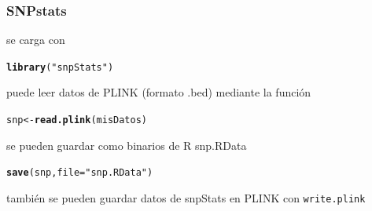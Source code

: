 \documentclass{beamer}\usepackage[]{graphicx}\usepackage[]{color}
\makeatletter
\newcommand{\hlstr}[1]{\textcolor[rgb]{0.192,0.494,0.8}{#1}}%
\newcommand{\hlstd}[1]{\textcolor[rgb]{0.345,0.345,0.345}{#1}}%
\newcommand{\hlkwb}[1]{\textcolor[rgb]{0.69,0.353,0.396}{#1}}%
\newcommand{\hlkwc}[1]{\textcolor[rgb]{0.333,0.667,0.333}{#1}}%
\newcommand{\hlkwd}[1]{\textcolor[rgb]{0.737,0.353,0.396}{\textbf{#1}}}%
\newenvironment{kframe}{%
 \def\at@end@of@kframe{}%
 \ifinner\ifhmode%
  \def\at@end@of@kframe{\end{minipage}}%
  \begin{minipage}{\columnwidth}%
 \fi\fi%
 \def\FrameCommand##1{\hskip\@totalleftmargin \hskip-\fboxsep
 \colorbox{shadecolor}{##1}\hskip-\fboxsep
     \hskip-\linewidth \hskip-\@totalleftmargin \hskip\columnwidth}%
 \MakeFramed {\advance\hsize-\width
   \@totalleftmargin\z@ \linewidth\hsize
   \@setminipage}}%
 {\par\unskip\endMakeFramed%
 \at@end@of@kframe}
\newenvironment{knitrout}{}{} %
\makeatother
\begin{document}
\begin{frame}[fragile]
\frametitle{SNPstats}

se carga con 

\begin{knitrout}\footnotesize
{}\color{fgcolor}\begin{kframe}
\begin{alltt}
\hlkwd{library}\hlstd{(}\hlstr{"snpStats"}\hlstd{)}
\end{alltt}


{\ttfamily\noindent\itshape\color{messagecolor}{\#\# Loading required package: survival}}

{\ttfamily\noindent\itshape\color{messagecolor}{\#\# Loading required package: Matrix}}\end{kframe}
\end{knitrout}

puede leer datos de PLINK (formato .bed) mediante la funci\'on 

\begin{knitrout}\footnotesize
{}\color{fgcolor}\begin{kframe}
\begin{alltt}
\hlstd{snp}\hlkwb{<-}\hlkwd{read.plink}\hlstd{(misDatos)}
\end{alltt}
\end{kframe}
\end{knitrout}

se pueden guardar como binarios de R snp.RData
\begin{knitrout}\footnotesize
{}\color{fgcolor}\begin{kframe}
\begin{alltt}
\hlkwd{save}\hlstd{(snp,} \hlkwc{file}\hlstd{=}\hlstr{"snp.RData"}\hlstd{)}
\end{alltt}
\end{kframe}
\end{knitrout}

tambi\'en se pueden guardar datos de snpStats en PLINK con {\tt write.plink}
\end{frame}
\end{document}
